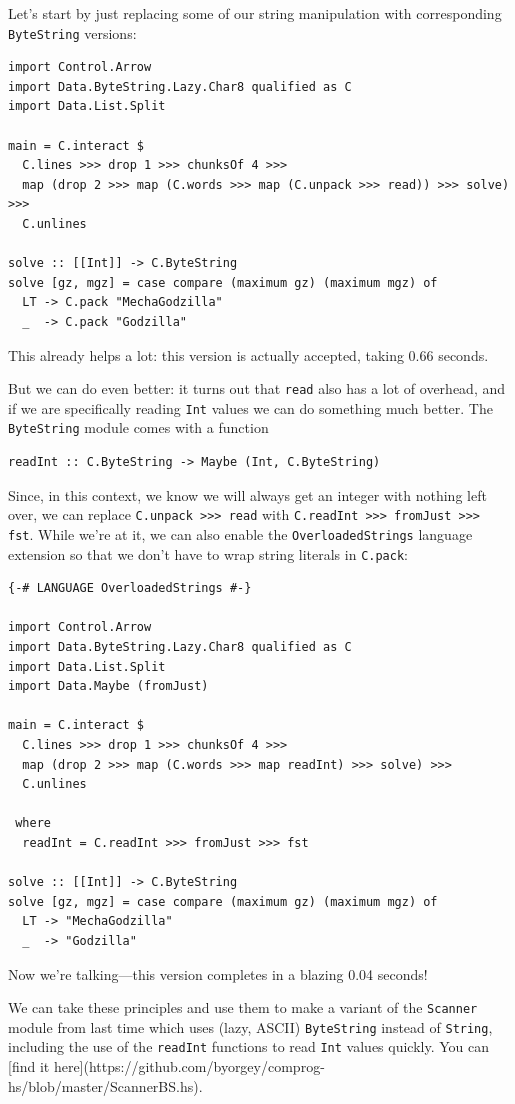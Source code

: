 \documentclass{book}
\newcommand{\h}[1]{\texttt{#1}}
\begin{document}
Let's start by just replacing some of our string manipulation with
corresponding \h{ByteString} versions:

\begin{verbatim}
import Control.Arrow
import Data.ByteString.Lazy.Char8 qualified as C
import Data.List.Split

main = C.interact $
  C.lines >>> drop 1 >>> chunksOf 4 >>>
  map (drop 2 >>> map (C.words >>> map (C.unpack >>> read)) >>> solve) >>>
  C.unlines

solve :: [[Int]] -> C.ByteString
solve [gz, mgz] = case compare (maximum gz) (maximum mgz) of
  LT -> C.pack "MechaGodzilla"
  _  -> C.pack "Godzilla"
\end{verbatim}

This already helps a lot: this version is actually accepted, taking
0.66 seconds.

But we can do even better: it turns out that \h{read} also has a lot of
overhead, and if we are specifically reading \h{Int} values we can do
something much better.  The \h{ByteString} module comes with a function
\begin{verbatim}
readInt :: C.ByteString -> Maybe (Int, C.ByteString)
\end{verbatim}
Since, in this context, we know we will always get an integer with
nothing left over, we can replace \h{C.unpack >>> read} with \h{C.readInt
>>> fromJust >>> fst}.  While we're at it, we can also enable the
\h{OverloadedStrings} language extension so that we don't have to wrap
string literals in \h{C.pack}:

\begin{verbatim}
{-# LANGUAGE OverloadedStrings #-}

import Control.Arrow
import Data.ByteString.Lazy.Char8 qualified as C
import Data.List.Split
import Data.Maybe (fromJust)

main = C.interact $
  C.lines >>> drop 1 >>> chunksOf 4 >>>
  map (drop 2 >>> map (C.words >>> map readInt) >>> solve) >>>
  C.unlines

 where
  readInt = C.readInt >>> fromJust >>> fst

solve :: [[Int]] -> C.ByteString
solve [gz, mgz] = case compare (maximum gz) (maximum mgz) of
  LT -> "MechaGodzilla"
  _  -> "Godzilla"
\end{verbatim}
Now we're talking---this version completes in a blazing 0.04 seconds!

We can take these principles and use them to make a variant of the
\h{Scanner} module from last time which uses (lazy, ASCII)
\h{ByteString} instead of \h{String}, including the use of the
\h{readInt} functions to read \h{Int} values quickly.  You can [find
it
here](https://github.com/byorgey/comprog-hs/blob/master/ScannerBS.hs).
\end{document}
